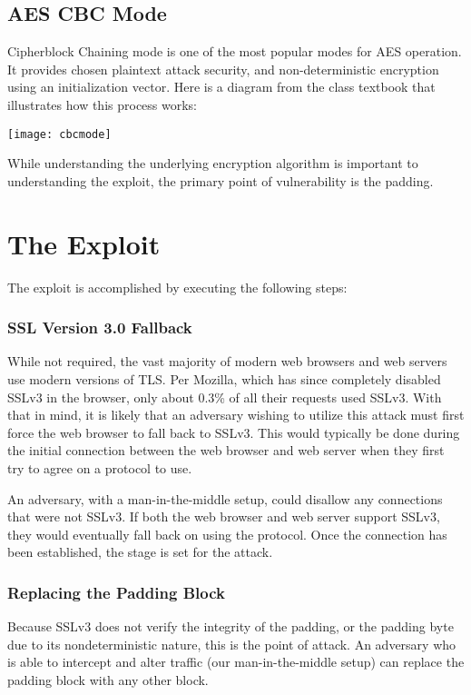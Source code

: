 \documentclass[10pt]{article}
\begin{document}
\subsection*{AES CBC Mode}
Cipherblock Chaining mode is one of the most popular modes for AES operation.
It provides chosen plaintext attack security, and non-deterministic encryption
using an initialization vector. Here is a diagram from the class textbook that
illustrates how this process works:\cite{rosulek}

\texttt{[image: cbcmode]}

While understanding the underlying encryption algorithm is important to understanding
the exploit, the primary point of vulnerability is the padding.

\section*{The Exploit}
The exploit is accomplished by executing the following steps:

\subsubsection*{SSL Version 3.0 Fallback}
While not required, the vast majority of modern web browsers and web servers use
modern versions of TLS. Per Mozilla, which has since completely disabled SSLv3
in the browser, only about 0.3\% of all their requests used SSLv3.\cite{MozillaPOODLE}
With that in mind, it is likely that an adversary wishing to utilize this attack
must first force the web browser to fall back to SSLv3. This would typically be
done during the initial connection between the web browser and web server when
they first try to agree on a protocol to use. 

An adversary, with a man-in-the-middle setup, could disallow any connections
that were not SSLv3. If both the web browser and web server support SSLv3, they
would eventually fall back on using the protocol.\cite{POODLE} Once the connection
has been established, the stage is set for the attack.

\subsubsection*{Replacing the Padding Block}
Because SSLv3 does not verify the integrity of the padding, or the padding byte
due to its nondeterministic nature, this is the point of attack. An adversary
who is able to intercept and alter traffic (our man-in-the-middle setup) can
replace the padding block with any other block. 
\end{document}
